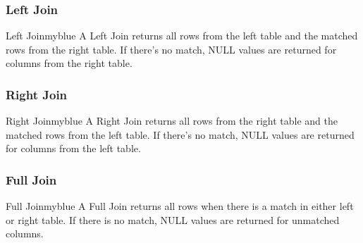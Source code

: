 \subsubsection{Left Join}

\begin{prettyBox}{Left Join}{myblue}
A Left Join returns all rows from the left table and the matched rows from the right table. If there’s no match,
NULL values are returned for columns from the right table.

\begin{center}
\end{center}
\end{prettyBox}

\vspace{0.25cm}
\subsubsection{Right Join}
\begin{prettyBox}{Right Join}{myblue}
A Right Join returns all rows from the right table and the matched rows from the left table. If there’s no match,
NULL values are returned for columns from the left table.
\begin{center}
\end{center}
\end{prettyBox}

\vspace{0.25cm}
\subsubsection{Full Join}

\begin{prettyBox}{Full Join}{myblue}
A Full Join returns all rows when there is a match in either left or right table. If there is no match,
NULL values are returned for unmatched columns.
\begin{center}
\end{center}
\end{prettyBox}

